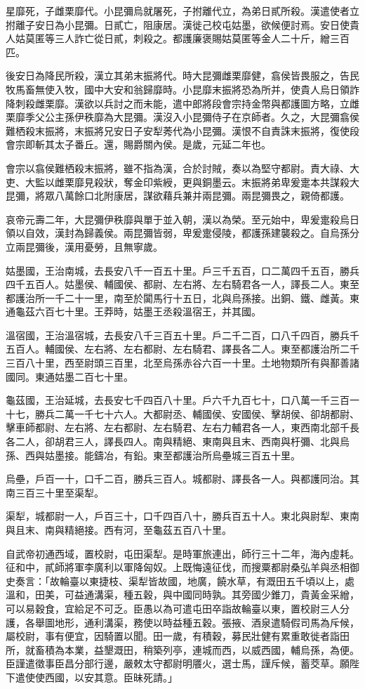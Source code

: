 \begin{pinyinscope}
星靡死，子雌栗靡代。小昆彌烏就屠死，子拊離代立，為弟日貳所殺。漢遣使者立拊離子安日為小昆彌。日貳亡，阻康居。漢徙己校屯姑墨，欲候便討焉。安日使貴人姑莫匿等三人詐亡從日貳，刺殺之。都護廉褒賜姑莫匿等金人二十斤，繒三百匹。

後安日為降民所殺，漢立其弟末振將代。時大昆彌雌栗靡健，翕侯皆畏服之，告民牧馬畜無使入牧，國中大安和翁歸靡時。小昆靡末振將恐為所并，使貴人烏日領詐降刺殺雌栗靡。漢欲以兵討之而未能，遣中郎將段會宗持金幣與都護圖方略，立雌栗靡季父公主孫伊秩靡為大昆彌。漢沒入小昆彌侍子在京師者。久之，大昆彌翕侯難栖殺末振將，末振將兄安日子安犁莠代為小昆彌。漢恨不自責誅末振將，復使段會宗即斬其太子番丘。還，賜爵關內侯。是歲，元延二年也。

會宗以翕侯難栖殺末振將，雖不指為漢，合於討賊，奏以為堅守都尉。責大祿、大吏、大監以雌栗靡見殺狀，奪金印紫綬，更與銅墨云。末振將弟卑爰疐本共謀殺大昆彌，將眾八萬餘口北附康居，謀欲藉兵兼并兩昆彌。兩昆彌畏之，親倚都護。

哀帝元壽二年，大昆彌伊秩靡與單于並入朝，漢以為榮。至元始中，卑爰疐殺烏日領以自效，漢封為歸義侯。兩昆彌皆弱，卑爰疐侵陵，都護孫建襲殺之。自烏孫分立兩昆彌後，漢用憂勞，且無寧歲。

姑墨國，王治南城，去長安八千一百五十里。戶三千五百，口二萬四千五百，勝兵四千五百人。姑墨侯、輔國侯、都尉、左右將、左右騎君各一人，譯長二人。東至都護治所一千二十一里，南至於闐馬行十五日，北與烏孫接。出銅、鐵、雌黃。東通龜茲六百七十里。王莽時，姑墨王丞殺溫宿王，并其國。

溫宿國，王治溫宿城，去長安八千三百五十里。戶二千二百，口八千四百，勝兵千五百人。輔國侯、左右將、左右都尉、左右騎君、譯長各二人。東至都護治所二千三百八十里，西至尉頭三百里，北至烏孫赤谷六百一十里。土地物類所有與鄯善諸國同。東通姑墨二百七十里。

龜茲國，王治延城，去長安七千四百八十里。戶六千九百七十，口八萬一千三百一十七，勝兵二萬一千七十六人。大都尉丞、輔國侯、安國侯、擊胡侯、卻胡都尉、擊車師都尉、左右將、左右都尉、左右騎君、左右力輔君各一人，東西南北部千長各二人，卻胡君三人，譯長四人。南與精絕、東南與且末、西南與杅彌、北與烏孫、西與姑墨接。能鑄冶，有鉛。東至都護治所烏壘城三百五十里。

烏壘，戶百一十，口千二百，勝兵三百人。城都尉、譯長各一人。與都護同治。其南三百三十里至渠犁。

渠犁，城都尉一人，戶百三十，口千四百八十，勝兵百五十人。東北與尉犁、東南與且末、南與精絕接。西有河，至龜茲五百八十里。

自武帝初通西域，置校尉，屯田渠犁。是時軍旅連出，師行三十二年，海內虛耗。征和中，貳師將軍李廣利以軍降匈奴。上既悔遠征伐，而搜粟都尉桑弘羊與丞相御史奏言：「故輪臺以東捷枝、渠犁皆故國，地廣，饒水草，有溉田五千頃以上，處溫和，田美，可益通溝渠，種五穀，與中國同時孰。其旁國少錐刀，貴黃金采繒，可以易穀食，宜給足不可乏。臣愚以為可遣屯田卒詣故輪臺以東，置校尉三人分護，各舉圖地形，通利溝渠，務使以時益種五穀。張掖、酒泉遣騎假司馬為斥候，屬校尉，事有便宜，因騎置以聞。田一歲，有積穀，募民壯健有累重敢徙者詣田所，就畜積為本業，益墾溉田，稍築列亭，連城而西，以威西國，輔烏孫，為便。臣謹遣徵事臣昌分部行邊，嚴敕太守都尉明餍火，選士馬，謹斥候，蓄茭草。願陛下遣使使西國，以安其意。臣昧死請。」


\end{pinyinscope}
